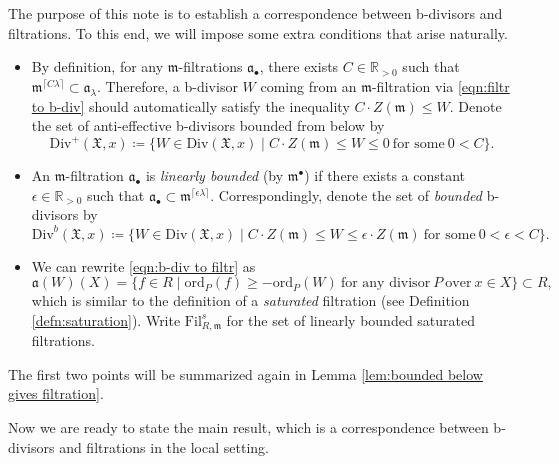 \documentclass[11pt, leqno]{amsart}%
\theoremstyle{plain}
\theoremstyle{definition}
\theoremstyle{remark}
\newcommand{\bR}{\mathbb{R}}
\newcommand{\fX}{\mathfrak{X}}
\newcommand{\fa}{\mathfrak{a}}
\newcommand{\fm}{\mathfrak{m}}
\newcommand{\ord}{\mathrm{ord}}
\newcommand{\Div}{\mathrm{Div}}
\newcommand{\Fil}{\mathrm{Fil}}
\begin{document}
The purpose of this note is to establish a correspondence between b-divisors and filtrations. 
To this end, we will impose some extra conditions that arise naturally.
\begin{itemize}
    \item By definition, for any $\fm$-filtrations $\fa_\bullet$, there exists $C\in\bR_{>0}$ such that $\fm^{\lceil C\lambda \rceil}\subset \fa_\lambda$. Therefore, a b-divisor $W$ coming from an $\fm$-filtration via \eqref{eqn:filtr to b-div} should automatically satisfy the inequality $C\cdot Z(\fm)\le W$. 
    Denote the set of anti-effective b-divisors bounded from below by
    \[
        \Div^+(\fX,x)\coloneqq\{W\in\Div(\fX,x)\mid C\cdot Z(\fm)\le W\le 0~ \text{for some}~ 0<C\}.
    \]

    \item An $\fm$-filtration $\fa_\bullet$ is \emph{linearly bounded} (by $\fm^\bullet$) if there exists a constant $\epsilon\in\bR_{>0}$ such that $\fa_\bullet\subset \fm^{\lceil \epsilon \lambda\rceil}$. Correspondingly, denote the set of \emph{bounded} b-divisors by
    \[
        \Div^b(\fX,x)\coloneqq\{W\in\Div(\fX,x)\mid C\cdot Z(\fm)\le W\le \epsilon\cdot Z(\fm)~ \text{for some}~ 0<\epsilon<C\}.
    \]
    
    \item We can rewrite \eqref{eqn:b-div to filtr} as
    \[
        \fa(W)(X)=\{f\in R\mid \ord_P(f)\ge -\ord_P(W)~ \text{for any divisor}~ P~\text{over}~ x\in X\}\subset R,
    \]
    which is similar to the definition of a \emph{saturated} filtration (see Definition \ref{defn:saturation}). 
    Write $\Fil^s_{R,\fm}$ for the set of linearly bounded saturated filtrations. 
\end{itemize}

The first two points will be summarized again in Lemma \ref{lem:bounded below gives filtration}. 

\medskip


Now we are ready to state the main result, which is a correspondence between b-divisors and filtrations in the local setting. 
\end{document}
